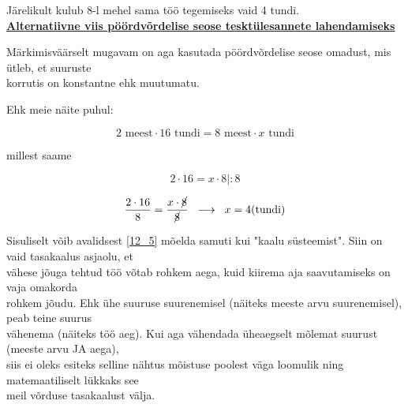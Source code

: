\begin{center}
{{{\begin{flushleft}
\hspace{5mm} Järelikult kulub 8-l mehel sama töö tegemiseks vaid 4 tundi.\\

\vspace{5mm}
\hspace{5mm} \textbf{\underline{Alternatiivne viis pöördvõrdelise seose tesktülesannete lahendamiseks}}

\vspace{5mm}
\hspace{5mm} Märkimisväärselt mugavam on aga kasutada pöördvõrdelise seose omadust, mis ütleb, et suuruste\\ \hspace{5mm} korrutis on konstantne ehk muutumatu.

\vspace{2mm}
\hspace{5mm} Ehk meie näite puhul: 

\begin{equation}
\label{12_5}
2\text{ meest}\cdot 16 \text{ tundi} = 8 \text{ meest} \cdot x \text{ tundi}
\end{equation}

\vspace{2mm}
\hspace{5mm} millest saame

\begin{equation}
\label{12_6}
2\cdot 16 = x \cdot 8 \bigg| : 8
\end{equation}

\begin{equation}
\label{12_7}
\dfrac{2\cdot 16}{8} = \dfrac{x\cdot \cancel{8}}{\cancel{8}} \hspace{2mm} \longrightarrow \hspace{2mm} x = 4 \text{(tundi)}
\end{equation}

\vspace{2mm}
\hspace{5mm} Sisuliselt võib avalidsest \ref{12_5} mõelda samuti kui "kaalu süsteemist". Siin on vaid tasakaalus asjaolu, et\\ \hspace{5mm} vähese jõuga tehtud töö võtab rohkem aega, kuid kiirema aja saavutamiseks on vaja omakorda \\ \hspace{5mm} rohkem jõudu. Ehk ühe suuruse suurenemisel (näiteks meeste arvu suurenemisel), peab teine suurus\\ \hspace{5mm} vähenema (näiteks töö aeg). Kui aga vähendada üheaegselt mõlemat suurust (meeste arvu JA aega),\\ \hspace{5mm} siis ei oleks esiteks selline nähtus mõistuse poolest väga loomulik ning matemaatiliselt lükkaks see\\ \hspace{5mm} meil võrduse tasakaalust välja.
\end{flushleft}
}}}
\end{center}


